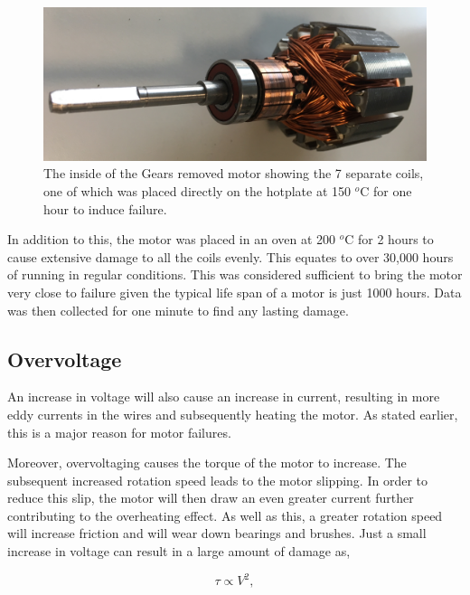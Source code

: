 \begin{figure}[t]
    \includegraphics[width=1.0\textwidth]{fig/Gears_Removed_Inside.png}
    \caption[Time Domain]{The inside of the Gears removed motor showing the 7 separate coils, one of which was placed directly on the hotplate at 150 $^o$C for one hour to induce failure.}
    \label{fig:hotplate_motor}
\end{figure}

In addition to this, the motor was placed in an oven at 200 $^o$C for 2 hours to cause extensive damage to all the coils evenly. This equates to over 30,000 hours of running in regular conditions. This was considered sufficient to bring the motor very close to failure given the typical life span of a motor is just 1000 hours. %
Data was then collected for one minute to find any lasting damage.



\subsection{Overvoltage}

An increase in voltage will also cause an increase in current, resulting in more eddy currents in the wires and subsequently heating the motor. As stated earlier, this is a major reason for motor failures. 

Moreover, overvoltaging causes the torque of the motor to increase. The subsequent increased rotation speed leads to the motor %
slipping. In order to reduce this slip, the motor will then draw an even greater current further contributing to the overheating effect. As well as this, a greater rotation speed will increase friction and will wear down bearings and brushes. Just a small increase in voltage can result in a large amount of damage as,

\begin{equation}
\tau \propto V^2,
\label{Torque}
\end{equation}

